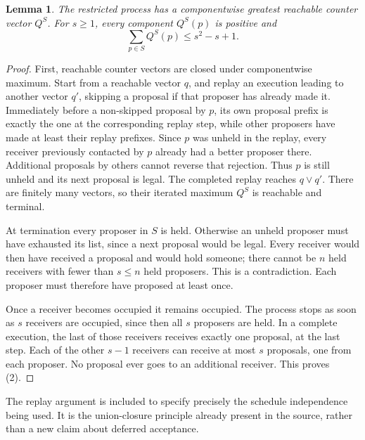 \documentclass[11pt]{article}
\newtheorem{lemma}[theorem]{Lemma}
\theoremstyle{definition}
\begin{document}
\begin{lemma}
The restricted process has a componentwise greatest reachable counter
vector $Q^S$. For $s\ge1$, every component $Q^S(p)$ is positive and
\[
 \sum_{p\in S}Q^S(p)\le s^2-s+1.                       \tag{2}
\]
\end{lemma}
\begin{proof}
First, reachable counter vectors are closed under componentwise maximum.
Start from a reachable vector $q$, and replay an execution leading to
another vector $q'$, skipping a proposal if that proposer has already
made it. Immediately before a non-skipped proposal by $p$, its own
proposal prefix is exactly the one at the corresponding replay step,
while other proposers have made at least their replay prefixes. Since
$p$ was unheld in the replay, every receiver previously contacted by $p$
already had a better proposer there. Additional proposals by others
cannot reverse that rejection. Thus $p$ is still unheld and its next
proposal is legal. The completed replay reaches $q\vee q'$.
There are finitely many vectors, so their iterated maximum $Q^S$ is
reachable and terminal.

At termination every proposer in $S$ is held. Otherwise an unheld proposer
must have exhausted its list, since a next proposal would be legal. Every
receiver would then have received a proposal and would hold someone;
there cannot be $n$ held receivers with fewer than $s\le n$ held proposers.
This is a contradiction. Each proposer must therefore have proposed at
least once.

Once a receiver becomes occupied it remains occupied. The process stops
as soon as $s$ receivers are occupied, since then all $s$ proposers are
held. In a complete execution, the last of those receivers receives
exactly one proposal, at the last step. Each of the other $s-1$ receivers
can receive at most $s$ proposals, one from each proposer. No proposal
ever goes to an additional receiver. This proves (2).
\end{proof}
The replay argument is included to specify precisely the schedule
independence being used. It is the union-closure principle already present
in the source, rather than a new claim about deferred acceptance.
\end{document}
